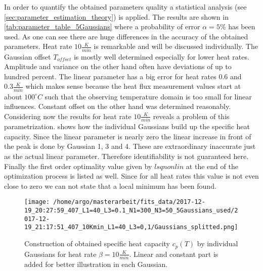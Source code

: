 \documentclass{scrartcl}[12pt, halfparskip]
\numberwithin{equation}{section}
\numberwithin{figure}{section}
\numberwithin{table}{section}
\begin{document}
In order to quantify the obtained parameters quality a statistical analysis (see \cref{sec:parameter_estimation_theory}) is applied. The results are shown in \cref{tab:parameter_table_5Gaussians} where a probability of error $\alpha=5\%$ has been used. As one can see there are huge differences in the accuracy of the obtained parameters. Heat rate $10 \frac{K}{min}$ is remarkable and will be discussed individually. The Gaussian offset $T_{offset}$ is mostly well determined especially for lower heat rates. Amplitude and variance on the other hand often have deviations of up to hundred percent. The linear parameter has a big error for heat rates $0.6$ and $0.3 \frac{K}{min}$ which makes sense because the heat flux measurement values start at about $100^{\circ}C$ such that the observing temperature domain is too small for linear influences. Constant offset on the other hand was determined reasonably. \\
Considering now the results for heat rate $10 \frac{K}{min}$ reveals a problem of this parametrization.  shows how the individual Gaussians build up the specific heat capacity. Since the linear parameter is nearly zero the linear increase in front of the peak is done by Gaussian 1, 3 and 4. These are extraordinary inaccurate just as the actual linear parameter. Therefore identifiability is not guaranteed here. \\
Finally the first order optimality value given by $lsqnonlin$ at the end of the optimization process is listed as well. Since for all heat rates this value is not even close to zero we can not state that a local minimum has been found.


\begin{figure}[H]
	\centering
	\texttt{[image: /home/argo/masterarbeit/fits\_data/2017-12-19\_20:27:59\_407\_L1=40\_L3=0.1\_N1=300\_N3=50\_5Gaussians\_used/2017-12-19\_21:17:51\_407\_10Kmin\_L1=40\_L3=0,1/Gaussians\_splitted.png]}
	\caption{Construction of obtained specific heat capacity $c_p(T)$ by individual Gaussians for heat rate $\beta = 10 \frac{K}{min}$. Linear and constant part is added for better illustration in each Gaussian.}
	\label{fig:Gaussians_splitted_pathologic}
\end{figure}
\end{document}
